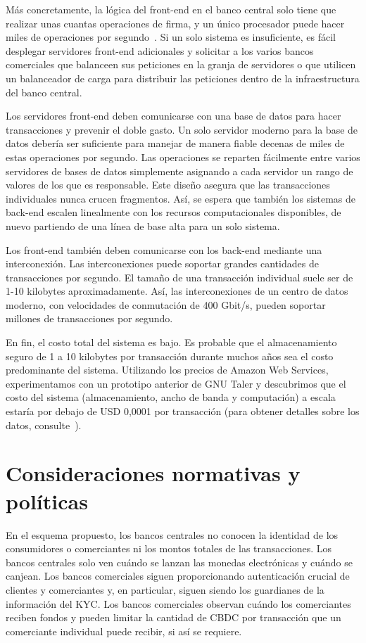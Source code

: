 \documentclass[a4paper,10pt]{article} %
\begin{document}
Más concretamente, la lógica del front-end en el banco central solo tiene que
realizar unas cuantas operaciones de firma, y un único procesador puede hacer
miles de operaciones por segundo~\cite[véase][]{Bernstein2020}. Si un solo
sistema es insuficiente, es fácil desplegar servidores front-end adicionales y
solicitar a los varios bancos comerciales que balanceen sus peticiones en la
granja de servidores o que utilicen un balanceador de carga para distribuir
las peticiones dentro de la infraestructura del banco central.

Los servidores front-end deben comunicarse con una base de datos para
hacer transacciones y prevenir el doble gasto. Un solo servidor moderno
para la base de datos debería ser suficiente para manejar de manera
fiable decenas de miles de estas operaciones por segundo. Las
operaciones se reparten fácilmente entre varios servidores de bases de
datos simplemente asignando a cada servidor un rango de valores de los
que es responsable. Este diseño asegura que las transacciones
individuales nunca crucen fragmentos. Así, se espera que también los
sistemas de back-end escalen linealmente con los recursos
computacionales disponibles, de nuevo partiendo de una línea de base
alta para un solo sistema.

Los front-end también deben comunicarse con los back-end mediante una
interconexión. Las interconexiones puede soportar grandes cantidades de
transacciones por segundo. El tamaño de una transacción individual suele
ser de 1-10 kilobytes aproximadamente. Así, las interconexiones de un
centro de datos moderno, con velocidades de conmutación de 400 Gbit/s,
pueden soportar millones de transacciones por segundo.

En fin, el costo total del sistema es bajo. Es probable que el
almacenamiento seguro de 1 a 10 kilobytes por transacción durante muchos
años sea el costo predominante del sistema. Utilizando los precios de
Amazon Web Services, experimentamos con un prototipo anterior de GNU
Taler y descubrimos que el costo del sistema (almacenamiento, ancho de
banda y computación) a escala estaría por debajo de USD 0,0001 por
transacción (para obtener detalles sobre los datos, consulte~\citet{Dold}).


\section{Consideraciones normativas y políticas}
    \label{5.-consideraciones-normativas-y-poluxedticas}

En el esquema propuesto, los bancos centrales no conocen la identidad de
los consumidores o comerciantes ni los montos totales de las
transacciones. Los bancos centrales solo ven cuándo se lanzan las
monedas electrónicas y cuándo se canjean. Los bancos comerciales siguen
proporcionando autenticación crucial de clientes y comerciantes y, en
particular, siguen siendo los guardianes de la información del KYC. Los
bancos comerciales observan cuándo los comerciantes reciben fondos y
pueden limitar la cantidad de CBDC por transacción que un comerciante
individual puede recibir, si así se requiere.
\end{document}
